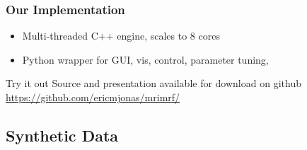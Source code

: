\documentclass[compress]{beamer}
\begin{document}
\begin{frame}
  \frametitle{Our Implementation}
  \begin{itemize}
  \item Multi-threaded C++ engine, scales to 8 cores
  \item Python wrapper for GUI, vis, control, parameter tuning, 
  \end{itemize}
  
  \pause
  \begin{block}{Try it out}
    Source and presentation available for download on github
    \url{https://github.com/ericmjonas/mrimrf/}
  \end{block}

\end{frame}

\subsection{Synthetic Data}
\end{document}
